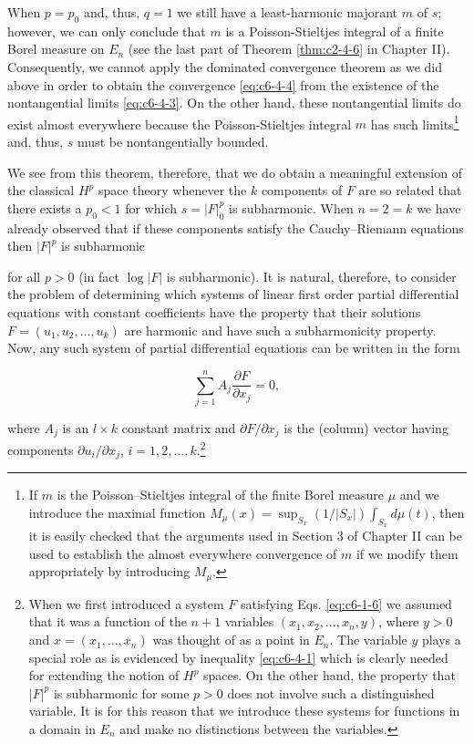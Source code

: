 When $p = p_{0}$ and, thus, $q = 1$ we still have a least-harmonic majorant $m$ of $s$; however, we can only conclude that $m$ is a Poisson-Stieltjes integral of a finite Borel measure on $E_{n}$ (see the last part of Theorem \ref{thm:c2-4-6} in Chapter II). Consequently, we cannot apply the dominated convergence theorem as we did above in order to obtain the convergence \eqref{eq:c6-4-4} from the existence of the nontangential limits \eqref{eq:c6-4-3}. On the other hand, these nontangential limits do exist almost everywhere because the Poisson-Stieltjes integral $m$ has such limits\footnote{If $m$ is the Poisson--Stieltjes integral of the finite Borel measure $\mu$ and we introduce the maximal function $M_\mu(x) = \sup_{S_x} (1/|S_x|) \int_{S_x} d\mu(t)$, then it is easily checked that the arguments used in Section 3 of Chapter II can be used to establish the almost everywhere convergence of $m$ if we modify them appropriately by introducing $M_\mu$.} and, thus, $s$ must be nontangentially bounded.

We see from this theorem, therefore, that we do obtain a meaningful extension of the classical $H^p$ space theory whenever the $k$ components of $F$ are so related that there exists a $p_0 < 1$ for which $s = |F|^p_0$ is subharmonic. When $n = 2 = k$ we have already observed that if these components satisfy the Cauchy--Riemann equations then $|F|^p$ is subharmonic

for all $p > 0$ (in fact $\log |F|$ is subharmonic). It is natural, therefore, to consider the problem of determining which systems of linear first order partial differential equations with constant coefficients have the property that their solutions $F = (u_1, u_2, \ldots, u_k)$ are harmonic and have such a subharmonicity property. Now, any such system of partial differential equations can be written in the form

\begin{equation}\label{eq:c6-4-5}
\sum_{j=1}^{n}A_{j}\frac{\partial F}{\partial x_{j}}=0,
\end{equation}

where $A_j$ is an $l \times k$ constant matrix and $\partial F/\partial x_j$ is the (column) vector having components $\partial u_i/\partial x_j$, $i = 1, 2, \ldots, k$.\footnote{When we first introduced a system $F$ satisfying Eqs. \eqref{eq:c6-1-6} we assumed that it was a function of the $n + 1$ variables $(x_1, x_2, \ldots, x_n, y)$, where $y > 0$ and $x = (x_1, \ldots, x_n)$ was thought of as a point in $E_n$. The variable $y$ plays a special role as is evidenced by inequality \eqref{eq:c6-4-1} which is clearly needed for extending the notion of $H^p$ spaces. On the other hand, the property that $|F|^p$ is subharmonic for some $p > 0$ does not involve such a distinguished variable. It is for this reason that we introduce these systems for functions in a domain in $E_n$ and make no distinctions between the variables.}

